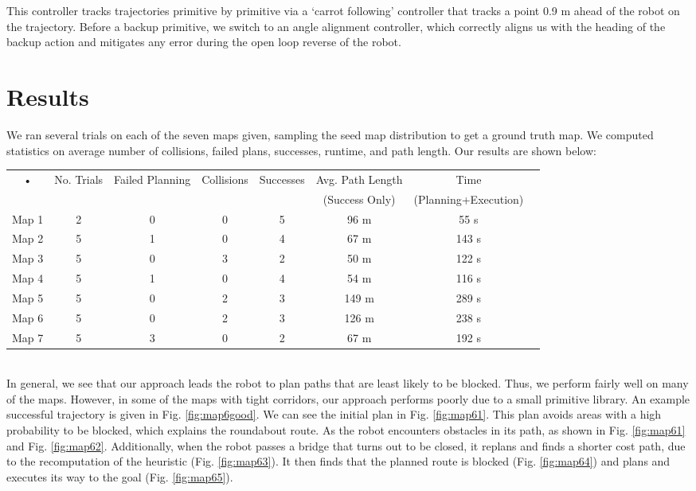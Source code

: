 \documentclass{article}
\begin{document}
This controller tracks trajectories primitive by primitive via a `carrot following' controller that tracks a point 0.9 m ahead of the robot on the trajectory. Before a backup primitive, we switch to an angle alignment controller, which correctly aligns us with the heading of the backup action and mitigates any error during the open loop reverse of the robot.
\section{Results}

We ran several trials on each of the seven maps given, sampling the seed map distribution to get a ground truth map. We computed statistics on average number of collisions, failed plans, successes, runtime, and path length. Our results are shown below: 
\vspace{24pt}\\
\begin{tabular}{|c|c|c|c|c|c|c|c|}
\hline 
• & No. Trials & Failed Planning & Collisions & Successes & Avg. Path Length & Time  \\ 
&&&&&(Success Only)&(Planning+Execution)\\
\hline 
Map 1 & 2 & 0 & 0 & 5 & 96 m & 55 s \\ 
\hline 
Map 2 & 5 & 1 & 0 & 4 & 67 m & 143 s \\ 
\hline 
Map 3 & 5 & 0 & 3 & 2 & 50 m & 122 s\\ 
\hline 
Map 4 & 5 & 1 & 0 & 4 & 54 m & 116 s \\ 
\hline 
Map 5 & 5 & 0 & 2 & 3 & 149 m & 289 s \\ 
\hline 
Map 6 & 5 & 0 & 2 & 3 & 126 m & 238 s \\ 
\hline 
Map 7 & 5 & 3 & 0 & 2 & 67 m & 192 s \\ 
\hline 
\end{tabular} 
\vspace{24pt}
\\
In general, we see that our approach leads the robot to plan paths that are least likely to be blocked. Thus, we perform fairly well on many of the maps. However, in some of the maps with tight corridors, our approach performs poorly due to a small primitive library. An example successful trajectory is given in Fig. \ref{fig:map6good}. We can see the initial plan in Fig. \ref{fig:map61}. This plan avoids areas with a high probability to be blocked, which explains the roundabout route. As the robot encounters obstacles in its path, as shown in Fig. \ref{fig:map61} and Fig. \ref{fig:map62}. Additionally, when the robot passes a bridge that turns out to be closed, it replans and finds a shorter cost path, due to the recomputation of the heuristic (Fig. \ref{fig:map63}). It then finds that the planned route is blocked (Fig. \ref{fig:map64}) and plans and executes its way to the goal (Fig. \ref{fig:map65}).
\end{document}

